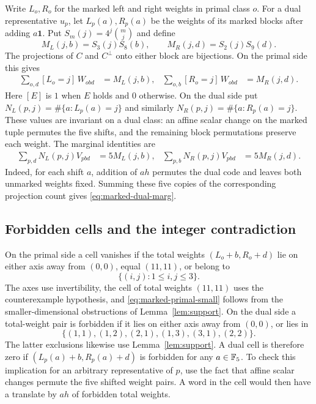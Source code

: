 Write \(L_o,R_o\) for the marked left and right weights in primal class \(o\). For a dual representative \(u_p\), let \(L_p(a),R_p(a)\) be the weights of its marked blocks after adding \(a\mathbf 1\). Put \(S_m(j)=4^j\binom mj\) and define
\[
 M_L(j,b)=S_3(j)S_8(b),\qquad
 M_R(j,d)=S_2(j)S_9(d).
\]
The projections of \(C\) and \(C^\perp\) onto either block are bijections. On the primal side this gives
\begin{align}
 \sum_{o,d} [L_o=j]\, W_{obd}&=M_L(j,b),&
 \sum_{o,b} [R_o=j]\, W_{obd}&=M_R(j,d).
 \label{eq:marked-primal-marg}
\end{align}
Here \([E]\) is \(1\) when \(E\) holds and \(0\) otherwise. On the dual side put
\(
 N_L(p,j)=\#\{a:L_p(a)=j\}
\)
and similarly \(N_R(p,j)=\#\{a:R_p(a)=j\}\).
These values are invariant on a dual class: an affine scalar change on the marked tuple permutes the five shifts, and the remaining block permutations preserve each weight. The marginal identities are
\begin{align}
 \sum_{p,d}N_L(p,j)V_{pbd}&=5M_L(j,b),&
 \sum_{p,b}N_R(p,j)V_{pbd}&=5M_R(j,d).
 \label{eq:marked-dual-marg}
\end{align}
Indeed, for each shift \(a\), addition of \(ah\) permutes the dual code and leaves both unmarked weights fixed. Summing these five copies of the corresponding projection count gives \eqref{eq:marked-dual-marg}.

\subsection{Forbidden cells and the integer contradiction}

On the primal side a cell vanishes if the total weights \((L_o+b,R_o+d)\) lie on either axis away from \((0,0)\), equal \((11,11)\), or belong to
\begin{equation}\label{eq:marked-primal-small}
 \{(i,j):1\le i,j\le3\}.
\end{equation}
The axes use invertibility, the cell of total weights \((11,11)\) uses the counterexample hypothesis, and \eqref{eq:marked-primal-small} follows from the smaller-dimensional obstructions of Lemma~\ref{lem:support}. On the dual side a total-weight pair is forbidden if it lies on either axis away from \((0,0)\), or lies in
\[
 \{(1,1),(1,2),(2,1),(1,3),(3,1),(2,2)\}.
\]
The latter exclusions likewise use Lemma~\ref{lem:support}. A dual cell is therefore zero if \((L_p(a)+b,R_p(a)+d)\) is forbidden for any \(a\in\mathbb F_5\). To check this implication for an arbitrary representative of \(p\), use the fact that affine scalar changes permute the five shifted weight pairs. A word in the cell would then have a translate by \(ah\) of forbidden total weights.

